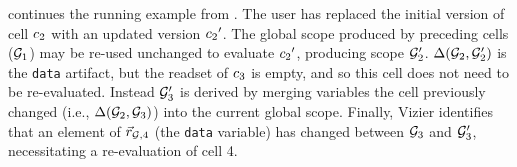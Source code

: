 
\begin{exam}
   continues the running example from .
  The user has replaced the initial version of cell $c_2$ with an updated version ${c_2}'$.
  The global scope produced by preceding cells ($\mathcal G_1$) may be re-used unchanged to evaluate ${c_2}'$, producing scope $\mathcal G_2'$.
  $\Delta(\mathcal G_2, \mathcal G_2')$ is the \lstinline{data} artifact, but the readset of $c_3$ is empty, and so this cell does not need to be re-evaluated.
  Instead $\mathcal G_3'$ is derived by merging variables the cell previously changed (i.e., $\Delta(\mathcal G_2, \mathcal G_3)$) into the current global scope.
  Finally, Vizier identifies that an element of $\vec r_{\mathcal G,4}$ (the \lstinline{data} variable) has changed between $\mathcal G_3$ and $\mathcal G_3'$, necessitating a re-evaluation of cell 4.
\end{exam}


